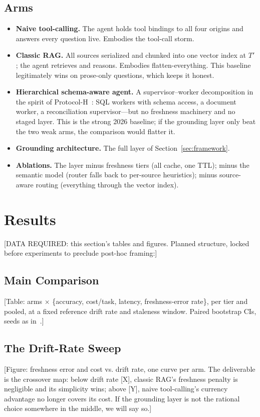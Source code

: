 \documentclass{ieeeaccess}
\begin{document}
\subsection{Arms}
\begin{itemize}
\item \textbf{Naive tool-calling.} The agent holds tool bindings to all four
origins and answers every question live. Embodies the tool-call storm.
\item \textbf{Classic RAG.} All sources serialized and chunked into one vector
index at $T'$; the agent retrieves and reasons. Embodies flatten-everything.
This baseline legitimately wins on prose-only questions, which keeps it honest.
\item \textbf{Hierarchical schema-aware agent.} A supervisor--worker
decomposition in the spirit of Protocol-H~\cite{protocolh}: SQL workers with
schema access, a document worker, a reconciliation supervisor---but no
freshness machinery and no staged layer. This is the strong 2026 baseline; if
the grounding layer only beat the two weak arms, the comparison would flatter
it.
\item \textbf{Grounding architecture.} The full layer of
Section~\ref{sec:framework}.
\item \textbf{Ablations.} The layer minus freshness tiers (all cache, one TTL);
minus the semantic model (router falls back to per-source heuristics); minus
source-aware routing (everything through the vector index).
\end{itemize}

\section{Results}
\label{sec:results}

[DATA REQUIRED: this section's tables and figures. Planned structure, locked
before experiments to preclude post-hoc framing:]

\subsection{Main Comparison}
[Table: arms $\times$ \{accuracy, cost/task, latency, freshness-error rate\},
per tier and pooled, at a fixed reference drift rate and staleness window.
Paired bootstrap CIs, seeds as in~\cite{par}.]

\subsection{The Drift-Rate Sweep}
[Figure: freshness error and cost vs. drift rate, one curve per arm. The
deliverable is the crossover map: below drift rate [X], classic RAG's
freshness penalty is negligible and its simplicity wins; above [Y], naive
tool-calling's currency advantage no longer covers its cost. If the grounding
layer is not the rational choice somewhere in the middle, we will say so.]
\end{document}
